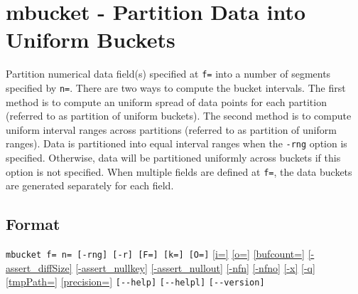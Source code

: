 
\section{mbucket - Partition Data into Uniform Buckets\label{sect:mbucket}}
Partition numerical data field(s) specified at \verb|f=| into a number of segments specified by \verb|n=|. There are two ways to compute the bucket intervals. The first method is to compute an uniform spread of data points for each partition (referred to as partition of uniform buckets). The second method is to compute uniform interval ranges across partitions (referred to as partition of uniform ranges). Data is partitioned into equal interval ranges when the \verb|-rng| option is specified. Otherwise, data will be partitioned uniformly across buckets if this option is not specified. When multiple fields are defined at \verb|f=|, the data buckets are generated separately for each field. 

\subsection*{Format}
\verb|mbucket f= n= [-rng] [-r] [F=] [k=] [O=]| 
\hyperref[sect:option_i]{[i=]}
\hyperref[sect:option_o]{[o=]}
\hyperref[sect:option_bufcount]{[bufcount=]} 
\hyperref[sect:option_assert_diffSize]{[-assert\_diffSize]}
\hyperref[sect:option_assert_nullkey]{[-assert\_nullkey]}
\hyperref[sect:option_assert_nullout]{[-assert\_nullout]}
\hyperref[sect:option_nfn]{[-nfn]} 
\hyperref[sect:option_nfno]{[-nfno]}  
\hyperref[sect:option_x]{[-x]}
\hyperref[sect:option_q]{[-q]}
\hyperref[sect:option_option_tmppath]{[tmpPath=]}
\hyperref[sect:option_precision]{[precision=]}
\verb|[--help]|
\verb|[--helpl]|
\verb|[--version]|\\

